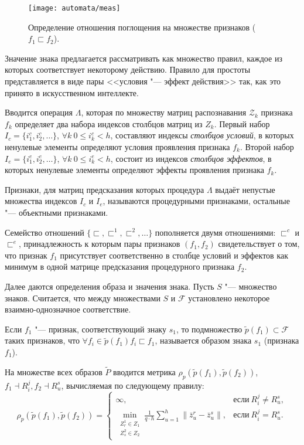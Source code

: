 \begin{figure}[h]
	\centering
	\texttt{[image: automata/meas]}
	\caption{Определение отношения поглощения на множестве признаков ($f_1\sqsubset f_2$).}
	\label{fig:rb_measure}
\end{figure}

Значение знака предлагается рассматривать как множество правил, каждое из которых соответствует некоторому действию. Правило для простоты представляется в виде пары <<условия "--- эффект действия>> так, как это принято в искусственном интеллекте. 

Вводится операция $\Lambda$, которая по множеству матриц распознавания $\mathcal Z_k$ признака $f_k$ определяет два набора индексов столбцов матриц из $Z_k$. Первый набор $I_c=\{i_1^c,i_2^c,\dots\}$, $\forall k\ 0\leqslant i_k^c < h$, составляют индексы \textit{столбцов условий}, в которых ненулевые элементы определяют условия проявления признака $f_k$. Второй набор $I_e=\{i_1^e,i_2^e,\dots\}$, $\forall k\ 0\leqslant i_k^e < h$, состоит из индексов  \textit{столбцов эффектов}, в которых ненулевые элементы определяют эффекты проявления признака $f_k$. 

\begin{Def}
	Признаки, для матриц предсказания которых процедура $\Lambda$ выдаёт непустые множества индексов $I_c$ и $I_e$, называются процедурными признаками, остальные "--- объектными признаками.
\end{Def}

Семейство отношений $\{\sqsubset,\sqsubset^1,\sqsubset^2,\dots\}$ пополняется двумя отношениями: $\sqsubset^c$ и $\sqsubset^e$, принадлежность к которым пары признаков $(f_1,f_2)$ свидетельствует о том, что признак $f_1$ присутствует соответственно в столбце условий и эффектов как минимум в одной матрице предсказания процедурного признака $f_2$.

Далее даются определения образа и значения знака. Пусть $S$ "--- множество знаков. Считается, что между множествами $S$ и $\mathcal F$ установлено некоторое взаимно-однозначное соответствие.

\begin{Def}
	Если $f_1$ "--- признак, соответствующий знаку $s_1$, то подмножество $\tilde p(f_1)\subset\mathcal F$ таких признаков, что $\forall f_i\in\tilde p(f_1) f_i\sqsubset f_1$, называется образом знака $s_1$ (признака $f_1$).
\end{Def}

На множестве всех образов $\tilde P$ вводится метрика $\rho_p(\tilde p(f_1),\tilde p(f_2))$, $f_1\dashv R_i^j, f_2\dashv R_u^s$, вычисляемая по следующему правилу:
\[
\rho_p(\tilde p(f_1),\tilde p(f_2))=
\begin{cases}
\infty, & \text{если}\ R_i^j\not=R_u^s,\\
\min\limits_{\substack{Z_r^1\in Z_1\\Z_s^2\in Z_2}}\frac{1}{q\cdot h}\sum\limits_{u=1}^h\|\bar z_u^r-\bar z_u^s\|, & \text{если}\ R_i^j=R_u^s.
\end{cases}
\]

